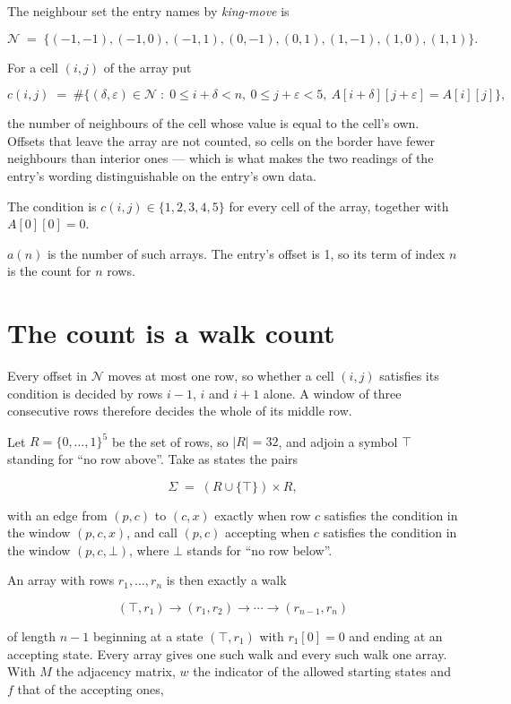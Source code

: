 \documentclass[11pt]{article}
\theoremstyle{definition}
\begin{document}
The neighbour set the entry names by {\itshape king-move} is

\[\mathcal{N} \;=\; \{(-1,-1), (-1,0), (-1,1), (0,-1), (0,1), (1,-1), (1,0), (1,1)\}.\]

For a cell $(i,j)$ of the array put

\[c(i,j) \;=\; \#\bigl\{(\delta,\varepsilon)\in\mathcal{N} \;:\; 0\le i+\delta<n,\ 0\le j+\varepsilon<5,\ A[i+\delta][j+\varepsilon] = A[i][j]\bigr\},\]

the number of neighbours of the cell whose value is equal to the cell's own. Offsets that leave the array are not counted, so cells on the border have fewer neighbours than interior ones --- which is what makes the two readings of the entry's wording distinguishable on the entry's own data.

The condition is $c(i,j) \in \{1, 2, 3, 4, 5\}$ for every cell of the array, together with $A[0][0]=0$.

$a(n)$ is the number of such arrays. The entry's offset is 1, so its term of index $n$ is the count for $n$ rows.

\section{The count is a walk count}

Every offset in $\mathcal{N}$ moves at most one row, so whether a cell $(i,j)$ satisfies its condition is decided by rows $i-1$, $i$ and $i+1$ alone. A window of three consecutive rows therefore decides the whole of its middle row.

Let $R = \{0,\dots,1\}^{5}$ be the set of rows, so $|R| = 32$, and adjoin a symbol $\top$ standing for ``no row above''. Take as states the pairs

\[\Sigma \;=\; (R \cup \{\top\}) \times R,\]

with an edge from $(p,c)$ to $(c,x)$ exactly when row $c$ satisfies the condition in the window $(p,c,x)$, and call $(p,c)$ accepting when $c$ satisfies the condition in the window $(p,c,\bot)$, where $\bot$ stands for ``no row below''.

An array with rows $r_1,\dots,r_n$ is then exactly a walk

\[(\top,r_1) \to (r_1,r_2) \to \cdots \to (r_{n-1},r_n)\]

of length $n-1$ beginning at a state $(\top,r_1)$ with $r_1[0]=0$ and ending at an accepting state. Every array gives one such walk and every such walk one array. With $M$ the adjacency matrix, $w$ the indicator of the allowed starting states and $f$ that of the accepting ones,
\end{document}
